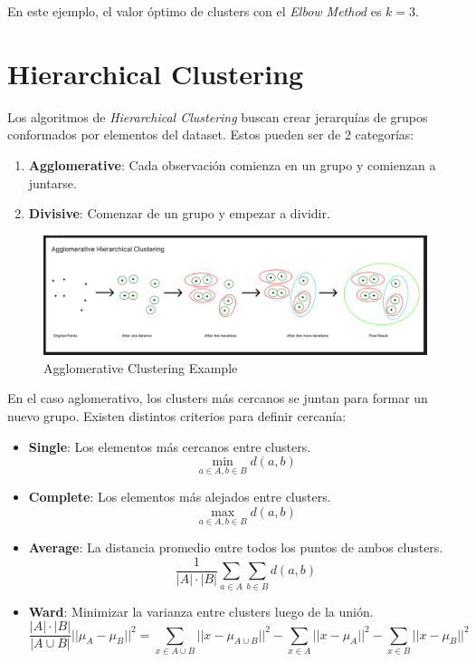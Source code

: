 En este ejemplo, el valor óptimo de clusters con el \textit{Elbow Method} es $k=3$.  

\section{Hierarchical Clustering}

Los algoritmos de \textit{Hierarchical Clustering} buscan crear jerarquías de grupos conformados por elementos del dataset. Estos pueden ser de 2 categorías: 

\begin{enumerate}
    \item \textbf{Agglomerative}: Cada observación comienza en un grupo y comienzan a juntarse. 
    \item \textbf{Divisive}: Comenzar de un grupo y empezar a dividir.
\end{enumerate}

\begin{figure}[H]
    \center
    \includegraphics[scale=0.25]{notebooks/ML/img/agg_clustering.png}
    \caption{Agglomerative Clustering Example}
\end{figure}

En el caso aglomerativo, los clusters más cercanos se juntan para formar un nuevo grupo. Existen distintos criterios para definir cercanía: 

\begin{itemize}
    \item \textbf{Single}: Los elementos más cercanos entre clusters. $$\min_{a \in A, b \in B} d(a,b)$$
    \item \textbf{Complete}: Los elementos más alejados entre clusters.  $$\max_{a \in A, b \in B} d(a,b)$$
    \item \textbf{Average}: La distancia promedio entre todos los puntos de ambos clusters. $$\frac{1}{|A| \cdot |B|}\sum_{a \in A} \sum_{b \in B} d(a,b)$$
    \item \textbf{Ward}: Minimizar la varianza entre clusters luego de la unión. 
    $$\frac{|A|\cdot|B|}{|A \cup B|}||\mu_A - \mu_B||^2 = \sum_{x \in A \cup B}||x - \mu_{A \cup B}||^2 - \sum_{x \in A}||x - \mu_{A}||^2 - \sum_{x \in B}||x - \mu_{B}||^2$$
\end{itemize}

